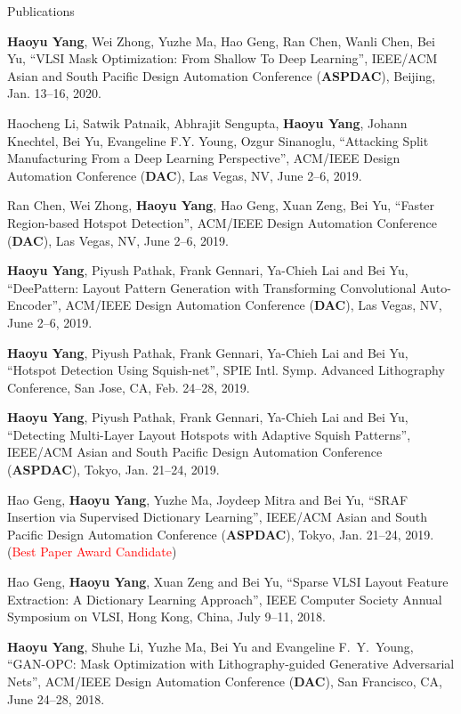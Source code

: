 \begin{rSection}{Publications}
\begin{description}[font=\normalfont]
	
	\item[{[C13]}] \textbf{Haoyu Yang}, Wei Zhong, Yuzhe Ma, Hao Geng, Ran Chen, Wanli Chen, Bei Yu,
	 ``VLSI Mask Optimization: From Shallow To Deep Learning'', 
	 IEEE/ACM Asian and South Pacific Design Automation Conference (\textbf{ASPDAC}), Beijing, Jan. 13–16, 2020.

	\item[{[C12]}]{
	Haocheng Li, Satwik Patnaik, Abhrajit Sengupta, \textbf{Haoyu Yang}, Johann Knechtel, Bei Yu, Evangeline F.Y. Young, Ozgur Sinanoglu, 
	``Attacking Split Manufacturing From a Deep Learning Perspective'',  
	ACM/IEEE Design Automation Conference (\textbf{DAC}), Las Vegas, NV, June 2--6, 2019.
	}
	\item[{[C11]}]{
	Ran Chen, Wei Zhong, \textbf{Haoyu Yang}, Hao Geng, Xuan Zeng, Bei Yu, ``Faster Region-based Hotspot Detection'',  
	ACM/IEEE Design Automation Conference (\textbf{DAC}), Las Vegas, NV, June 2--6, 2019.
	}
	\item[{[C10]}]{
	\textbf{Haoyu Yang}, Piyush Pathak, Frank Gennari, Ya-Chieh Lai and Bei Yu, ``DeePattern: Layout Pattern Generation with Transforming Convolutional Auto-Encoder'',  
	ACM/IEEE Design Automation Conference (\textbf{DAC}), Las Vegas, NV, June 2--6, 2019.
	}
	\item[{[C9]}]{
	\textbf{Haoyu Yang}, Piyush Pathak, Frank Gennari, Ya-Chieh Lai and Bei Yu, ``Hotspot Detection Using Squish-net'',  
	SPIE Intl. Symp. Advanced Lithography Conference, San Jose, CA, Feb. 24--28, 2019.
	}
	\item[{[C8]}]{
	\textbf{Haoyu Yang}, Piyush Pathak, Frank Gennari, Ya-Chieh Lai and Bei Yu, ``Detecting Multi-Layer Layout Hotspots with Adaptive Squish Patterns'',  
	IEEE/ACM Asian and South Pacific Design Automation Conference (\textbf{ASPDAC}), Tokyo, Jan. 21--24, 2019.
	}
	\item[{[C7]}]{
	Hao Geng, \textbf{Haoyu Yang}, Yuzhe Ma, Joydeep Mitra and Bei Yu, ``SRAF Insertion via Supervised Dictionary Learning'',  
	IEEE/ACM Asian and South Pacific Design Automation Conference (\textbf{ASPDAC}), Tokyo, Jan. 21--24, 2019. (\textcolor{red}{Best Paper Award Candidate})
	}
	\item[{[C6]}]{
		Hao Geng, \textbf{Haoyu Yang}, Xuan Zeng and Bei Yu, ``Sparse VLSI Layout Feature Extraction: A Dictionary Learning Approach'',  
		IEEE Computer Society Annual Symposium on VLSI, Hong Kong, China, July 9--11, 2018.
	}
	\item[{[C5]}]{
		\textbf{Haoyu Yang}, Shuhe Li, Yuzhe Ma, Bei Yu and Evangeline F.~Y.~Young, ``GAN-OPC: Mask Optimization with Lithography-guided Generative Adversarial Nets'', ACM/IEEE Design Automation Conference (\textbf{DAC}), San Francisco, CA, June 24--28, 2018. 
}
\end{description}
\end{rSection}
